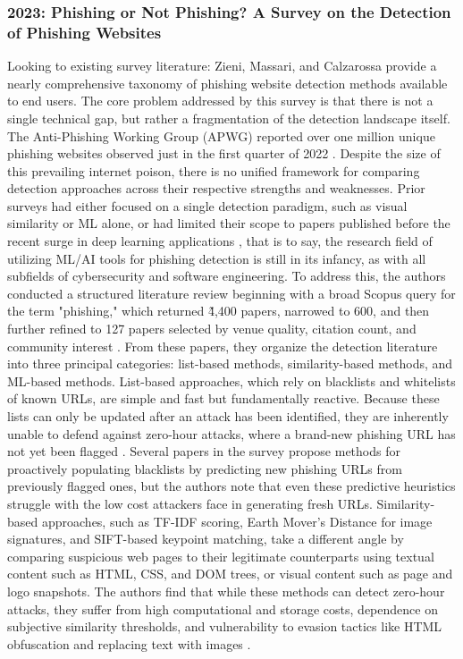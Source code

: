 \documentclass[conference]{IEEEtran}
\begin{document}
\subsubsection{2023: Phishing or Not Phishing? A Survey on the Detection of Phishing Websites}
Looking to existing survey literature: Zieni, Massari, and Calzarossa provide a nearly comprehensive taxonomy of phishing website detection methods available to end users. The core problem addressed by this survey is that there is not a single technical gap, but rather a fragmentation of the detection landscape itself. The Anti-Phishing Working Group (APWG) reported over one million unique phishing websites observed just in the first quarter of 2022 \cite{zieni_phishing_2023}. Despite the size of this prevailing internet poison, there is no unified framework for comparing detection approaches across their respective strengths and weaknesses. Prior surveys had either focused on a single detection paradigm, such as visual similarity or ML alone, or had limited their scope to papers published before the recent surge in deep learning applications \cite{zieni_phishing_2023}, that is to say, the research field of utilizing ML/AI tools for phishing detection is still in its infancy, as with all subfields of cybersecurity and software engineering. 
To address this, the authors conducted a structured literature review beginning with a broad Scopus query for the term "phishing," which returned  \~4,400 papers, narrowed to 600, and then further refined to 127 papers selected by venue quality, citation count, and community interest \cite{zieni_phishing_2023}. From these papers, they organize the detection literature into three principal categories: list-based methods, similarity-based methods, and ML-based methods.
List-based approaches, which rely on blacklists and whitelists of known URLs, are simple and fast but fundamentally reactive. Because these lists can only be updated after an attack has been identified, they are inherently unable to defend against zero-hour attacks, where a brand-new phishing URL has not yet been flagged \cite{zieni_phishing_2023}. Several papers in the survey propose methods for proactively populating blacklists by predicting new phishing URLs from previously flagged ones, but the authors note that even these predictive heuristics struggle with the low cost attackers face in generating fresh URLs.
Similarity-based approaches, such as TF-IDF scoring, Earth Mover's Distance for image signatures, and SIFT-based keypoint matching\cite{zieni_phishing_2023}, take a different angle by comparing suspicious web pages to their legitimate counterparts using textual content such as HTML, CSS, and DOM trees, or visual content such as page and logo snapshots. The authors find that while these methods can detect zero-hour attacks, they suffer from high computational and storage costs, dependence on subjective similarity thresholds, and vulnerability to evasion tactics like HTML obfuscation and replacing text with images \cite{zieni_phishing_2023}.
\end{document}
